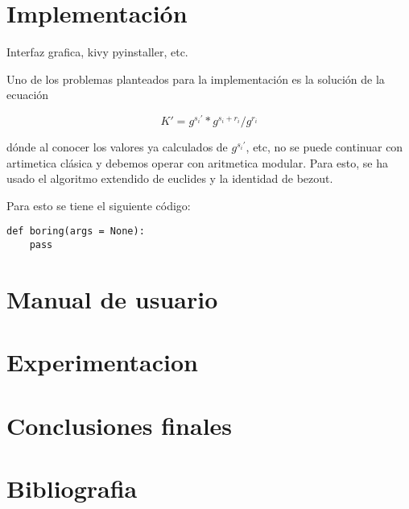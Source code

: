 \documentclass[10pt, a4paper, spanish]{report}
\begin{document}
\section{Implementación}
Interfaz grafica, kivy pyinstaller, etc. 

Uno de los problemas planteados para la implementación es la solución de la ecuación

\begin{equation}
    K' = g^{s_{i}'} * g^{s_{i}+r_{i}} / g^{r_{i}}
\end{equation}

dónde al conocer los valores ya calculados de $ g^{s_{i}'} $, etc, no se puede continuar con artimetica clásica y debemos operar con aritmetica modular. Para esto, se ha usado el algoritmo extendido de euclides y la identidad de bezout. 

Para esto se tiene el siguiente código:

\begin{lstlisting}
def boring(args = None):
    pass
\end{lstlisting}


\section{Manual de usuario}

\section{Experimentacion}
\section{Conclusiones finales}
\section{Bibliografia}
\end{document}
